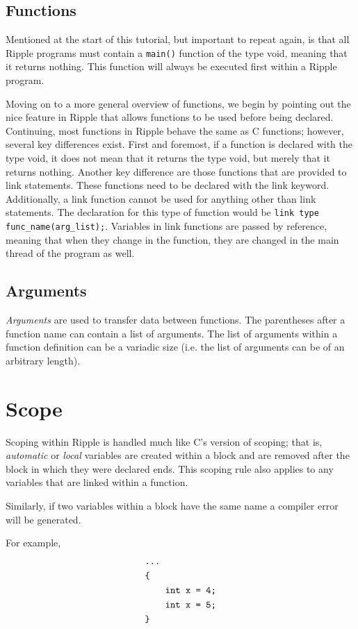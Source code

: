 \documentclass{article}
\newcommand{\code}{\texttt}
\begin{document}
\subsection{Functions}
Mentioned at the start of this tutorial, but important to repeat again, is that all Ripple programs must contain a \code{main()} function of the type void, meaning that it returns nothing. This function will always be executed first within a Ripple program.

Moving on to a more general overview of functions, we begin by pointing out the nice feature in Ripple that allows functions to be used before being declared. Continuing, most functions in Ripple behave the same as C functions; however, several key differences exist. First and foremost, if a function is declared with the type void, it does not mean that it returns the type void, but merely that it returns nothing. Another key difference are those functions that are provided to link statements. These functions need to be declared with the link keyword. Additionally, a link function cannot be used for anything other than link statements. The declaration for this type of function would be \code{link type func\_name(arg\_list);}. Variables in link functions are passed by reference, meaning that when they change in the function, they are changed in the main thread of the program as well. 

\subsection{Arguments}
\emph{Arguments} are used to transfer data between functions. The parentheses after a function name can contain a list of arguments. The list of arguments within a function definition can be a variadic size (i.e. the list of arguments can be of an arbitrary length).

\section{Scope}
Scoping within Ripple is handled much like C's version of scoping; that is, \emph{automatic} or \emph{local} variables are created within a block and are removed after the block in which they were declared ends. This scoping rule also applies to any variables that are linked within a function. 

Similarly, if two variables within a block have the same name a compiler error will be generated.

For example,
\begin{align*}
& \code{\ldots}                   \\
& \code{\{}                       \\
& \code{\qquad int x = 4;}        \\
& \code{\qquad int x = 5;} \\
& \code{\}}
\end{align*}
\end{document}
